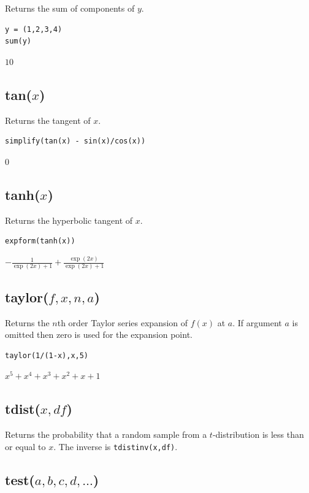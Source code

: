 Returns the sum of components of $y$.

{\color{blue}
\begin{verbatim}
y = (1,2,3,4)
sum(y)
\end{verbatim}
}

$10$

\subsection*{tan($x$)}

Returns the tangent of $x$.

{\color{blue}
\begin{verbatim}
simplify(tan(x) - sin(x)/cos(x))
\end{verbatim}
}

$0$

\subsection*{tanh($x$)}

Returns the hyperbolic tangent of $x$.

{\color{blue}
\begin{verbatim}
expform(tanh(x))
\end{verbatim}
}

$\displaystyle -\frac{1}{\exp(2x)+1}+\frac{\exp(2x)}{\exp(2x)+1}$

\subsection*{taylor($f,x,n,a$)}

Returns the $n$th order Taylor series expansion of $f(x)$ at $a$.
If argument $a$ is omitted then zero is used for the expansion point.

{\color{blue}
\begin{verbatim}
taylor(1/(1-x),x,5)
\end{verbatim}
}

$x^5+x^4+x^3+x^2+x+1$

\subsection*{tdist($x,df$)}

Returns the probability that a random sample from a $t$-distribution
is less than or equal to $x$.
The inverse is \verb$tdistinv(x,df)$.

\subsection*{test($a,b,c,d,\ldots$)}

